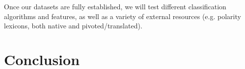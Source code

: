 \documentclass[11pt]{article}
\begin{document}
Once our datasets are fully established, we will test different classification algorithms and features, as well as a variety of external resources (e.g. polarity lexicons, both native and pivoted/translated).

\section{Conclusion}

\nocite{*}




\end{document}
